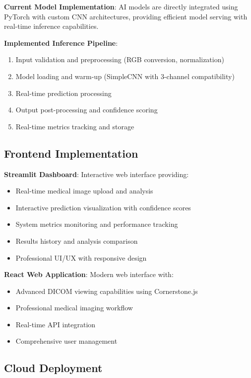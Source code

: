 \documentclass[12pt,a4paper]{article}
\begin{document}
\textbf{Current Model Implementation}: AI models are directly integrated using PyTorch with custom CNN architectures, providing efficient model serving with real-time inference capabilities.

\textbf{Implemented Inference Pipeline}:
\begin{enumerate}
    \item Input validation and preprocessing (RGB conversion, normalization)
    \item Model loading and warm-up (SimpleCNN with 3-channel compatibility)
    \item Real-time prediction processing
    \item Output post-processing and confidence scoring
    \item Real-time metrics tracking and storage
\end{enumerate}

\subsection{Frontend Implementation}

\textbf{Streamlit Dashboard}: Interactive web interface providing:
\begin{itemize}
    \item Real-time medical image upload and analysis
    \item Interactive prediction visualization with confidence scores
    \item System metrics monitoring and performance tracking
    \item Results history and analysis comparison
    \item Professional UI/UX with responsive design
\end{itemize}

\textbf{React Web Application}: Modern web interface with:
\begin{itemize}
    \item Advanced DICOM viewing capabilities using Cornerstone.js
    \item Professional medical imaging workflow
    \item Real-time API integration
    \item Comprehensive user management
\end{itemize}

\subsection{Cloud Deployment}
\end{document}

